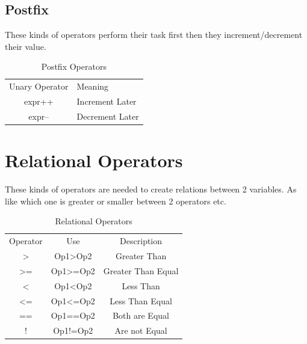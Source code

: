 \documentclass[openany]{book}  %
\begin{document}
\subsection{Postfix}
These kinds of operators\cite{Ref8} perform their task first then they increment/decrement their value.
% 
%
\begin{table}[htbp]
    \begin{tabular}{cl}
        Unary Operator & Meaning          \\
        expr++         & Increment  Later \\
        expr--         & Decrement Later
    \end{tabular}
    \centering
    \caption{Postfix Operators}
\end{table}
% 
% 
\section{Relational Operators}
These kinds of operators\cite{Ref8} are needed to create relations between 2 variables. As like which one is greater or smaller between 2 operators etc.
% 
%
\begin{table}[htbp]
    \begin{tabular}{ccc}
        Operator        & Use                   & Description        \\
        \textgreater{}  & Op1\textgreater{}Op2  & Greater Than       \\
        \textgreater{}= & Op1\textgreater{}=Op2 & Greater Than Equal \\
        \textless{}     & Op1\textless{}Op2     & Less Than          \\
        \textless{}=    & Op1\textless{}=Op2    & Less Than Equal    \\
        ==              & Op1==Op2              & Both are Equal     \\
        !               & Op1!=Op2              & Are not Equal
    \end{tabular}
    \centering
    \caption{Relational Operators}
\end{table}

\newpage

% 
% 
\end{document}
